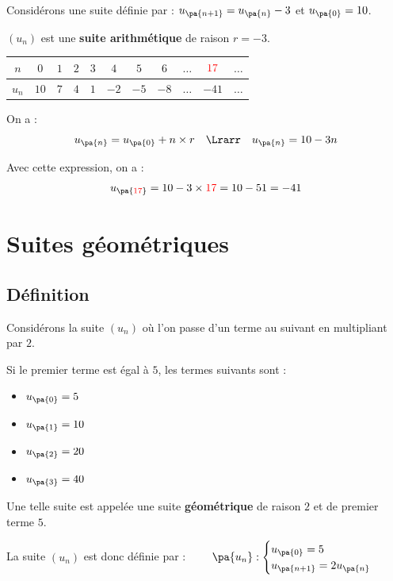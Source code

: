 \begin{ex}
	Considérons une suite définie par : $u_{\pa{n+1}}=u_{\pa{n}}-3$ et $u_{\pa{0}}=10$.

	$(u_n)$ est une \textbf{suite arithmétique} de raison $r=-3$.

	\begin{center}
		\begin{tabular}{|c|c|c|c|c|c|c|c|c|c|c}\hline
			\ccg $n$   & $0$  & $1$ & $2$ & $3$ & $4$  & $5$  & $6$  & $\dots$ & \ccg $\textcolor{red}{17}$ & $\dots$ \\ \hline
			\ccg $u_n$ & $10$ & $7$ & $4$ & $1$ & $-2$ & $-5$ & $-8$ & $\dots$ & \ccg $-41$                 & $\dots$ \\ \hline
		\end{tabular}
	\end{center}

	On a :
	\[
		u_{\pa{n}}=u_{\pa{0}}+n\times r \quad\Lrarr\quad u_{\pa{n}}=10-3n
	\]

	Avec cette expression, on a :
	\[
		u_{\pa{\textcolor{red}{17}}}=10-3\times \textcolor{red}{17} = 10-51 = -41
	\]
\end{ex}

\section{Suites géométriques}

\subsection{Définition}

\begin{ex}
	Considérons la suite $(u_{n})$ où l'on passe d'un terme au suivant en multipliant par $2$.

	Si le premier terme est égal à $5$, les termes suivants sont :

	\begin{itemize}
		\item $u_{\pa{0}} = 5$
		\item $u_{\pa{1}} = 10$
		\item $u_{\pa{2}} = 20$
		\item $u_{\pa{3}} = 40$
	\end{itemize}

	Une telle suite est appelée une suite \textbf{géométrique} de raison $2$ et de premier terme $5$.

	La suite $(u_n)$ est donc définie par : $\qquad\pa{u_n}:\begin{cases}u_{\pa{0}} = 5 \\u_{\pa{n + 1}} = 2u_{\pa{n}}\end{cases}$ \end{ex}

